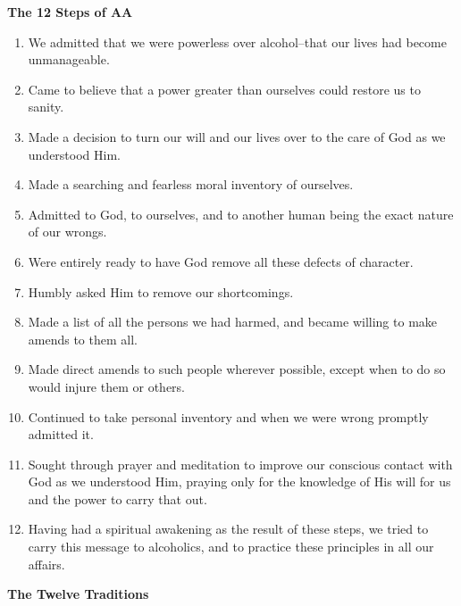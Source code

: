 \documentclass[11pt,twoside,letterpaper]{article}
\def\7pt{\fontsize{7}{8}\selectfont}
\def\8pt{\fontsize{8.5}{10}\selectfont}
\def\gutter{\hspace{0.02\textwidth}}
\begin{document}
  \begin{minipage}[l][\dimexpr 0.485\textheight][t]{\dimexpr 0.485\textwidth}
    \begin{minipage}[l][\dimexpr.485\textheight][t]{\dimexpr 0.445\textwidth}
      \raggedright
      {\8pt\textbf{The 12 Steps of AA}}\hrulefill

      {\7pt
      \begin{enumerate}[leftmargin=4ex]
        \itemsep 0em
        \item We admitted that we were powerless over alcohol--that our lives had become unmanageable.
        \item Came to believe that a power greater than ourselves could restore us to sanity.
        \item Made a decision to turn our will and our lives over to the care of God as we understood Him.
        \item Made a searching and fearless moral inventory of ourselves.
        \item Admitted to God, to ourselves, and to another human being the exact nature of our wrongs.
        \item Were entirely ready to have God remove all these defects of character.
        \item Humbly asked Him to remove our shortcomings.
        \item Made a list of all the persons we had harmed, and became willing to make amends to them all.
        \item Made direct amends to such people wherever possible, except when to do so would injure them or others.
        \item Continued to take personal inventory and when we were wrong promptly admitted it.
        \item Sought through prayer and meditation to improve our conscious contact with God as we understood Him, praying only for the knowledge of His will for us and the power to carry that out.
        \item Having had a spiritual awakening as the result of these steps, we tried to carry this message to alcoholics, and to practice these principles in all our affairs.
      \end{enumerate}
      }
    \end{minipage}
    \gutter
    \begin{minipage}[r][\dimexpr 0.485\textheight][t]{\dimexpr 0.525\textwidth}
      \raggedright
      {\8pt\textbf{The Twelve Traditions}}\hrulefill


\end{minipage}
\end{minipage}
\end{document}
